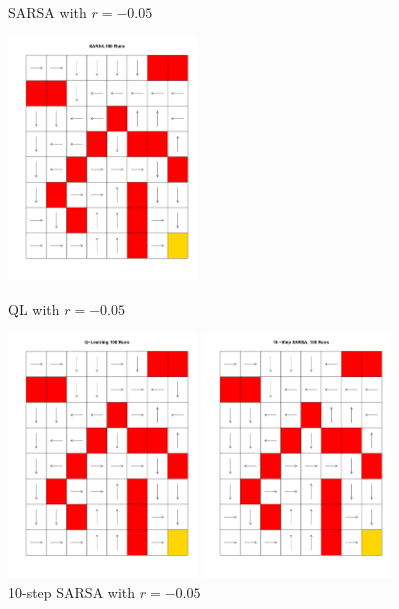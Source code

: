 \documentclass[final,12pt,3p]{elsarticle}
\begin{document}
\begin{figure}[H]
    \centering
    \begin{minipage}{.33\textwidth}
      \centering
      \caption{SARSA with $r=-0.05$}
      \includegraphics[width=5cm]{figures/005-sarsa.jpg}
    \end{minipage}%
    \begin{minipage}{.33\textwidth}
      \centering
      \caption{QL with $r=-0.05$}
      \includegraphics[width=5cm]{figures/005-ql.jpg}
    \end{minipage}
    \begin{minipage}{.33\textwidth}
      \centering
      \caption{10-step SARSA with $r=-0.05$}
      \includegraphics[width=5cm]{figures/005-10sarsa.jpg}
    \end{minipage}
\end{figure}
\end{document}
